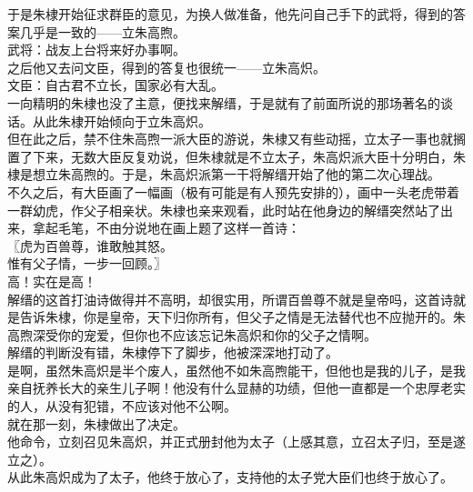 \begin{multicols}{\theparacolNo}
于是朱棣开始征求群臣的意见，为换人做准备，他先问自己手下的武将，得到的答案几乎是一致的——立朱高煦。\\

武将：战友上台将来好办事啊。\\

之后他又去问文臣，得到的答复也很统一——立朱高炽。\\

文臣：自古君不立长，国家必有大乱。\\

一向精明的朱棣也没了主意，便找来解缙，于是就有了前面所说的那场著名的谈话。从此朱棣开始倾向于立朱高炽。\\

但在此之后，禁不住朱高煦一派大臣的游说，朱棣又有些动摇，立太子一事也就搁置了下来，无数大臣反复劝说，但朱棣就是不立太子，朱高炽派大臣十分明白，朱棣是想立朱高煦的。于是，朱高炽派第一干将解缙开始了他的第二次心理战。\\

不久之后，有大臣画了一幅画（极有可能是有人预先安排的），画中一头老虎带着一群幼虎，作父子相亲状。朱棣也亲来观看，此时站在他身边的解缙突然站了出来，拿起毛笔，不由分说地在画上题了这样一首诗：\\

〖虎为百兽尊，谁敢触其怒。\\

惟有父子情，一步一回顾。〗\\

高！实在是高！\\

解缙的这首打油诗做得并不高明，却很实用，所谓百兽尊不就是皇帝吗，这首诗就是告诉朱棣，你是皇帝，天下归你所有，但父子之情是无法替代也不应抛开的。朱高煦深受你的宠爱，但你也不应该忘记朱高炽和你的父子之情啊。\\

解缙的判断没有错，朱棣停下了脚步，他被深深地打动了。\\

是啊，虽然朱高炽是半个废人，虽然他不如朱高煦能干，但他也是我的儿子，是我亲自抚养长大的亲生儿子啊！他没有什么显赫的功绩，但他一直都是一个忠厚老实的人，从没有犯错，不应该对他不公啊。\\

就在那一刻，朱棣做出了决定。\\

他命令，立刻召见朱高炽，并正式册封他为太子（上感其意，立召太子归，至是遂立之）。\\

从此朱高炽成为了太子，他终于放心了，支持他的太子党大臣们也终于放心了。\\


\end{multicols}
